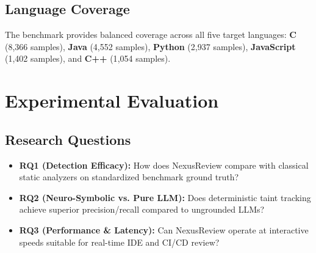 \documentclass[10pt,conference]{IEEEtran}
\begin{document}
\subsection{Language Coverage}
The benchmark provides balanced coverage across all five target languages:
\textbf{C} (8{,}366 samples), \textbf{Java} (4{,}552 samples), \textbf{Python} (2{,}937 samples), \textbf{JavaScript} (1{,}402 samples), and \textbf{C++} (1{,}054 samples).

\section{Experimental Evaluation}

\subsection{Research Questions}
\begin{itemize}
    \item \textbf{RQ1 (Detection Efficacy):} How does NexusReview compare with classical static analyzers on standardized benchmark ground truth?
    \item \textbf{RQ2 (Neuro-Symbolic vs. Pure LLM):} Does deterministic taint tracking achieve superior precision/recall compared to ungrounded LLMs?
    \item \textbf{RQ3 (Performance \& Latency):} Can NexusReview operate at interactive speeds suitable for real-time IDE and CI/CD review?
\end{itemize}

\begin{table}[t]
\centering
\caption{NexusReview comparative evaluation summary (case level).}
\label{tab:results}
\end{table}
\end{document}
